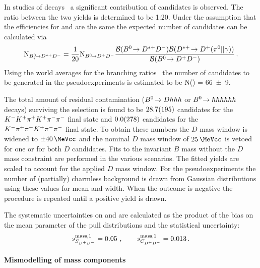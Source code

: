 In studies of \BdToDstD decays~\cite{BToDstDthesis} a significant contribution
of \BsToDstD candidates is observed. The ratio between the two yields is
determined to be 1:20. Under the assumption that the efficiencies for \BToDD
and \BToDstD are the same the expected number of \BsToDstD candidates can be
calculated via
\begin{align}
	\text{N}_{{{B}^0_{s}}\!\rightarrow {\ensuremath{{D}^{*+}}}{\ensuremath{{D}^-}}} = \frac{1}{20} \text{N}_{{{B}^0}\!\rightarrow {\ensuremath{{D}^+}}{\ensuremath{{D}^-}}} \frac{\mathcal{B}({{B}^0}\!\rightarrow {\ensuremath{{D}^{*+}}}{\ensuremath{{D}^-}}) \mathcal{B}({{D}^{*+}} \!\rightarrow {\ensuremath{{D}^+}} ({{\pi}^0} || \gamma))}{\mathcal{B}({{B}^0}\!\rightarrow {\ensuremath{{D}^+}}{\ensuremath{{D}^-}})} \,.
\end{align}
Using the world averages for the branching ratios~\cite{PDG2014} the number of
candidates to be generated in the pseudoexperiments is estimated to be
N(\BsToDstD) = \num{66\pm9}.

The total amount of residual contamination (${{B}^0}\!\rightarrow D hhh$ or ${{B}^0}\!\rightarrow
hhhhhh$ decays) surviving the \BdToDD selection is found to be
$\num{28.7\pm19.5}$ candidates for the ${{K}^-}{{K}^+}{{\pi}^+}{{K}^+}{{\pi}^-}{{\pi}^-}$ final state and
$\num{0.0\pm27.8}$ candidates for the ${{K}^-}{{\pi}^+}{{\pi}^+}{{K}^+}{{\pi}^-}{{\pi}^-}$ final state. To obtain these
numbers the $D$ mass window is widened to $\SI{\pm40}{\MeVcc}$ and the nominal
$D$ mass window of $\SI{25}{\MeVcc}$ is vetoed for one or for both $D$
candidates. Fits to the invariant $B$ mass without the $D$ mass constraint are
performed in the various scenarios.
%
The fitted yields are scaled to account for the applied $D$ mass window. For
the pseudoexperiments the number of (partially) charmless background is drawn
from Gaussian distributions using these values for mean and width. When the
outcome is negative the procedure is repeated until a positive yield is drawn.

The systematic uncertainties on \SDD and \CDD are calculated as the product of
the bias on the mean parameter of the pull distributions and the statistical
uncertainty:
\begin{align*}
s_{S_{{{D}^+}{{D}^-}}}^{\text{mass,1}} = \num{0.05}\ , \qquad s_{C_{{{D}^+}{{D}^-}}}^{\text{mass,1}} = \num{0.013}\,.
\end{align*}

\paragraph{Mismodelling of mass components}


